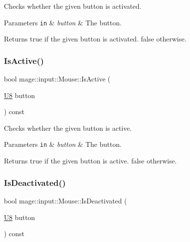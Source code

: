 Checks whether the given button is activated.


\begin{DoxyParams}[1]{Parameters}
\mbox{\tt in}  & {\em button} & The button. \\
\hline
\end{DoxyParams}
\begin{DoxyReturn}{Returns}
{\ttfamily true} if the given button is activated. {\ttfamily false} otherwise. 
\end{DoxyReturn}
\mbox{\label{classmage_1_1input_1_1_mouse_a071d1e562f177efcc09b9e60aaf4f378}} 
\subsubsection{\texorpdfstring{Is\+Active()}{IsActive()}}
{\footnotesize\ttfamily bool mage\+::input\+::\+Mouse\+::\+Is\+Active (\begin{DoxyParamCaption}\item[{\mbox{\hyperlink{namespacemage_a30677c03d683c4c35630c25f6ff3fb7f}{U8}}}]{button }\end{DoxyParamCaption}) const\hspace{0.3cm}{\ttfamily [noexcept]}}

Checks whether the given button is active.


\begin{DoxyParams}[1]{Parameters}
\mbox{\tt in}  & {\em button} & The button. \\
\hline
\end{DoxyParams}
\begin{DoxyReturn}{Returns}
{\ttfamily true} if the given button is active. {\ttfamily false} otherwise. 
\end{DoxyReturn}
\mbox{\label{classmage_1_1input_1_1_mouse_afebf2a9e9cd25c6cb8ff7f203fbcab45}} 
\subsubsection{\texorpdfstring{Is\+Deactivated()}{IsDeactivated()}}
{\footnotesize\ttfamily bool mage\+::input\+::\+Mouse\+::\+Is\+Deactivated (\begin{DoxyParamCaption}\item[{\mbox{\hyperlink{namespacemage_a30677c03d683c4c35630c25f6ff3fb7f}{U8}}}]{button }\end{DoxyParamCaption}) const\hspace{0.3cm}{\ttfamily [noexcept]}}

